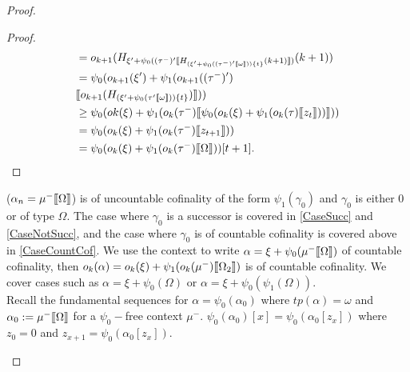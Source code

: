 \documentclass{amsart}
\theoremstyle{plain}
\theoremstyle{plain}
\def\scbrl{[\hspace{-.14em}[}
\def\scbrr{]\hspace{-.14em}]}
\def\scbr#1{\scbrl#1\scbrr}
\newcommand{\Om}{{\Omega}}
\newcommand{\okpe}{o_{k+1}}
\newcommand{\ok}{o_{k}}
\newcommand{\al}{{\alpha}}
\newcommand{\ga}{\gamma}
\newcommand{\om}{\omega}
\def\scbrl{[\hspace{-.14em}[}
\def\scbrr{]\hspace{-.14em}]}
\def\scbr#1{\scbrl#1\scbrr}
\begin{document}
\begin{proof}
\begin{Cases}
\begin{Cases}
\begin{Cases}
\begin{proof}
\begin{align*}
                    &= \okpe(H_{\xi'+\psi_0((\tau^-)'\scbr{ H_{(\xi'+\psi_0((\tau^-)'\scbr{\om}))\{t\}}(k+1)})}(k+1)) \\
                    &=\psi_0(\okpe(\xi')+ \psi_1(\okpe((\tau^-)') \\
                    &	\scbr{	\okpe( H_{(\xi'+\psi_0(\tau'\scbr{\om}))\{t\}})}))\\
                    &\geq \psi_0( ok(\xi)+\psi_1(\ok(\tau^-) \scbr{ \psi_0( \ok(\xi)+ \psi_1(\ok(\tau)\scbr{z_t}) )})) \\
                    &=\psi_0( \ok(\xi)+ \psi_1(\ok(\tau^-)\scbr{z_{t+1}}))\\
                    &=\psi_0( \ok(\xi)+ \psi_1(\ok(\tau^-)\scbr{\Om}))[t+1].
                \end{align*}
            \end{proof}
            

            
            \item ($\al_n = \mu^-\scbr{\Om}$) is of uncountable cofinality of the form $\psi_1(\ga_0)$ and $\ga_0$ is either 0 or of type $\Om$. The case where $\ga_0$ is a successor is covered in  \ref{CaseSucc} and \ref{CaseNotSucc}, and the case where $\ga_0$  is of countable cofinality is covered above in \ref{CaseCountCof}.
            We use the context to write $\al= \xi +\psi_0(\mu^-\scbr{\Om})$  of countable cofinality, then  $\ok(\al)= \ok(\xi) + \psi_1(\ok(\mu^-)\scbr{\Om_2})$ is of countable cofinality.
            We cover cases such as $\al = \xi + \psi_0(\Om)$ or $\al = \xi +\psi_0(\psi_1(\Om))$.\smallskip
            \\
            Recall the fundamental sequences for $\al = \psi_0(\al_0)$ where $tp(\al)=\om$ and $\al_0 :=\mu^-\scbr{\Om}$ for a $\psi_0-$free context $\mu^-$.
            $\psi_0(\al_0)[x] = \psi_0(\al_0[z_x])$ where $z_0=0$ and $z_{x+1}= \psi_0(\al_0[z_x])$.\medskip
            

\end{Cases}
\end{Cases}
\end{Cases}
\end{proof}
\end{document}
